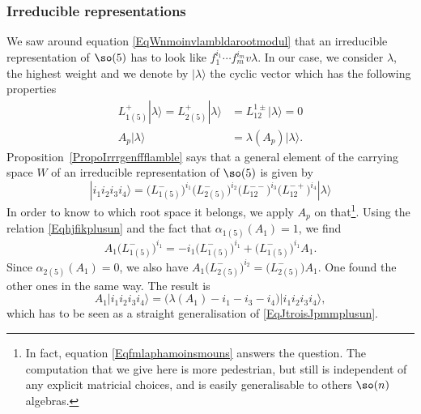 \subsubsection{Irreducible representations}

We saw around equation \eqref{EqWnmoinvlambldarootmodul} that an irreducible representation of $\so(5)$ has to look like $f_1^{i_1}\cdots f_m^{i_m}v\lambda$. In our case, we consider $\lambda$, the highest weight and we denote by $| \lambda \rangle$ the cyclic vector which has the following properties
\begin{subequations}
	\begin{align}
		L^{+}_{1(5)}| \lambda \rangle=L^{+}_{2(5)}| \lambda \rangle&=L^{1\pm}_{12}| \lambda \rangle=0\\
		A_p| \lambda \rangle&=\lambda(A_p)| \lambda \rangle.
	\end{align}
\end{subequations}
Proposition~\ref{PropoIrrrgenffflamble} says that a general element of the carrying space $W$ of an irreducible representation of $\so(5)$ is given by
\begin{equation}
	| i_1i_2i_3i_4 \rangle = \big( L^-_{1(5)} \big)^{i_1} \big( L_{2(5)}^- \big)^{i_2}\big( L^{--}_{12} \big)^{i_3}\big( L^{-+}_{12} \big)^{i_4}	| \lambda \rangle
\end{equation}
In order to know to which root space it belongs, we apply $A_p$ on that\footnote{In fact, equation \eqref{Eqfmlaphamoinsmouns} answers the question. The computation that we give here is more pedestrian, but still is independent of any explicit matricial choices, and is easily generalisable to others $\so(n)$ algebras.}. Using the relation \eqref{Eqhjfikplusun} and the fact that $\alpha_{1(5)}(A_1)=1$, we find
\begin{equation}
	A_1\big( L^-_{1(5)} \big)^{i_1}=-i_1\big( L^-_{1(5)} \big)^{i_1}+\big( L^-_{1(5)} \big)^{i_1}A_1.
\end{equation}
Since $\alpha_{2(5)}(A_1)=0$, we also have $A_1\big( L_{2(5)}^- \big)^{i_2}=\big( L_{2(5)}^- \big)A_1$. One found the other ones in the same way. The result is
\begin{equation}
	A_1| i_1i_2i_3i_4 \rangle=\big( \lambda(A_1)-i_1-i_3-i_4 \big)| i_1i_2i_3i_4 \rangle,
\end{equation}
which has to be seen as a straight generalisation of \eqref{EqJtroisJpmmplusun}.

